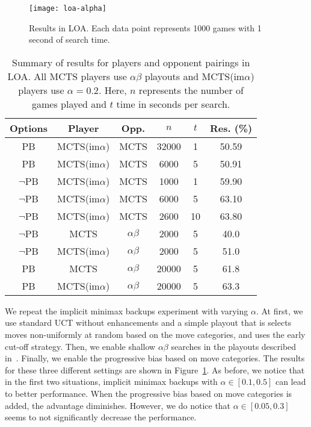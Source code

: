 \documentclass{article}
\begin{document}
\begin{figure}[t]
\begin{center}
\texttt{[image: loa-alpha]}
\caption{Results in LOA. Each data point represents 1000 games with 1 second of search time. } 
\label{fig:loa-alpha}
\end{center}
\end{figure}

\begin{table}[t]
\begin{center}
\begin{tabular}{ccccc|c}
Options & Player        & Opp. & $n$ & $t$ & Res. (\%) \\
\hline
\hline
PB      & MCTS(im$\alpha$) & MCTS     & 32000 & 1        & 50.59       \\
PB      & MCTS(im$\alpha$) & MCTS     & 6000  & 5        & 50.91       \\
\hline
$\neg$PB & MCTS(im$\alpha$) & MCTS & 1000 & 1  & 59.90       \\
$\neg$PB & MCTS(im$\alpha$) & MCTS & 6000 & 5  & 63.10       \\
$\neg$PB & MCTS(im$\alpha$) & MCTS & 2600 & 10 & 63.80       \\
\hline
$\neg$PB & MCTS             & $\alpha \beta$ & 2000 & 5  & 40.0       \\
$\neg$PB & MCTS(im$\alpha$) & $\alpha \beta$ & 2000 & 5 & 51.0       \\
\hline
PB       & MCTS             & $\alpha \beta$ & 20000 & 5  & 61.8       \\
PB       & MCTS(im$\alpha$) & $\alpha \beta$ & 20000 & 5  & 63.3       \\
\hline
\end{tabular}
\end{center}
\caption{Summary of results for players and opponent pairings in LOA. 
All MCTS players use $\alpha \beta$ playouts and MCTS(im$\alpha$) players use $\alpha = 0.2$. 
Here, $n$ represents the number of games played and $t$ time in seconds per search.}
\label{tbl:loaresults}
\end{table}


We repeat the implicit minimax backups experiment with varying $\alpha$. At first, we use standard UCT without enhancements 
and a simple playout that is selects moves non-uniformly at random based on the move categories, and uses the early cut-off strategy. 
Then, we enable shallow $\alpha \beta$ searches in the playouts described in~\cite{Winands11AB}. 
Finally, we enable the progressive bias based on move categories. The results for these 
three different settings are shown in Figure~\ref{fig:loa-alpha}. As before, we notice that in the first two situations,
implicit minimax backups with $\alpha \in [0.1,0.5]$ can lead to better performance. When the progressive bias based on move 
categories is added, the advantage diminishes. However, we do notice that $\alpha \in [0.05,0.3]$ seems to not significantly 
decrease the performance. 
\end{document}
